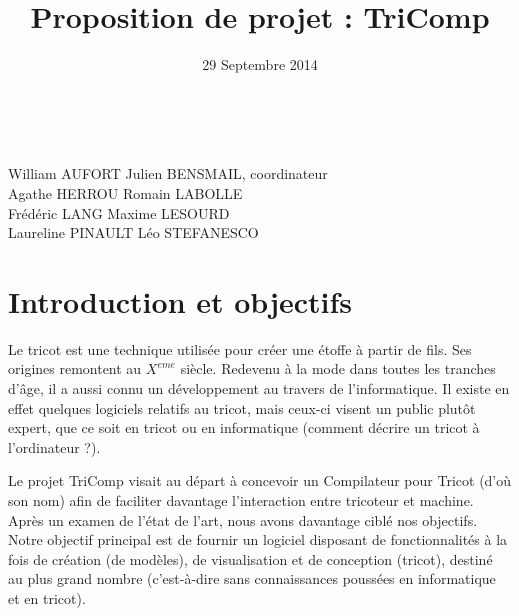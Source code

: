 \documentclass{article}
\title{Proposition de projet : TriComp}
\author{}
\date{29 Septembre 2014}
\begin{document}
\makeatletter %
  \begin{titlepage}
    \begin{center}
       {\LARGE \@title} \\
       \vspace{1cm}
       {\large \@date}
       \vspace{2cm}
    \end{center}
       {\large
       William AUFORT \hfill Julien BENSMAIL, coordinateur\\
       Agathe HERROU  \hfill Romain LABOLLE \\
       Frédéric LANG \hfill Maxime LESOURD \\
       Laureline PINAULT \hfill Léo STEFANESCO}
  \tableofcontents
  \end{titlepage}
\makeatother

\pagebreak

%



\section{Introduction et objectifs}

Le tricot est une technique utilisée pour créer une étoffe à partir de fils. Ses origines remontent au $X^{eme}$ siècle.
Redevenu à la mode dans toutes les tranches d'âge, il a aussi connu un développement au travers de l'informatique. Il existe en effet
quelques logiciels relatifs au tricot, mais ceux-ci visent un public plutôt expert, que ce soit en tricot ou en informatique (comment
décrire un tricot à l'ordinateur ?).

Le projet TriComp visait au départ à concevoir un Compilateur pour Tricot (d'où son nom) afin de faciliter davantage l'interaction entre
tricoteur et machine. Après un examen de l'état de l'art, nous avons davantage ciblé nos objectifs. Notre objectif principal est de
fournir un logiciel disposant de fonctionnalités à la fois de création (de modèles), de visualisation et de conception (tricot),
destiné au plus grand nombre (c'est-à-dire sans connaissances poussées en informatique et en tricot).
\end{document}
